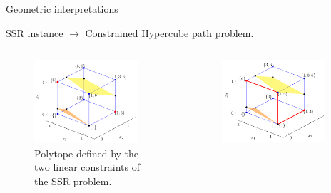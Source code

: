 \begin{frame}{Geometric interpretations}
  \begin{block}{SSR instance $\rightarrow$ Constrained Hypercube path problem.}
            \begin{columns}
                \begin{column}{0.5\textwidth}
                    \begin{figure}
                    \centering
                    \includegraphics[width=0.9\textwidth]{img/subset_2.png}
                    \caption{Polytope defined by the two linear constraints of the SSR problem.}
                    \label{fig:ps}
                    \end{figure}
                \end{column}
                \begin{column}{0.5\textwidth}
                    \begin{figure}
                    \centering
                    \includegraphics[width=0.9\textwidth]{img/subset_3.png}

\end{figure}
\end{column}
\end{columns}
\end{block}
\end{frame}

